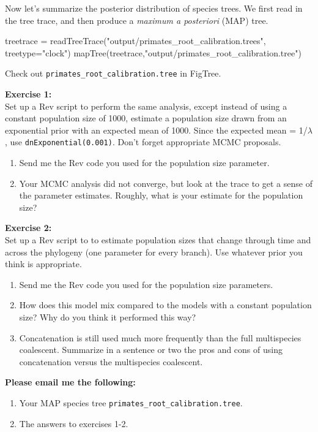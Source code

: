 \documentclass[11pt]{article}
\begin{document}
Now let's summarize the posterior distribution of species trees.
We first read in the tree trace, and then produce a \textit{maximum a posteriori} (MAP) tree.
\begin{code}
treetrace = readTreeTrace("output/primates_root_calibration.trees", treetype="clock")
mapTree(treetrace,"output/primates_root_calibration.tree")
\end{code}
Check out \texttt{primates\_root\_calibration.tree} in FigTree.

\begin{framed}
\noindent
\textbf{Exercise 1:} \\
Set up a Rev script to perform the same
analysis, except instead of using a constant
population size of 1000, estimate a population size
drawn from an exponential prior with an expected mean of 1000. 
Since the expected mean = 1/$\lambda$, use \texttt{dnExponential(0.001)}.
Don't forget appropriate MCMC proposals.
\begin{enumerate}
\item Send me the Rev code you used for the population size parameter.
\item Your MCMC analysis did not converge, but look at the trace
        to get a sense of the parameter estimates. Roughly, what is
            your estimate for the population size? %
\end{enumerate}
\end{framed}

\begin{framed}
\noindent
\textbf{Exercise 2:} \\
Set up a Rev script to to estimate
population sizes that change through time 
and across the phylogeny (one parameter for every branch).
Use whatever prior you think is appropriate.
\begin{enumerate}
\item Send me the Rev code you used for the population size parameters.
\item How does this model mix compared to the models with a constant population size? Why do you think it performed this way?
\item Concatenation is still used much more frequently than the full multispecies coalescent.
        Summarize in a sentence or two the pros and cons of using concatenation versus the multispecies coalescent.
\end{enumerate}
\end{framed}

\begin{framed}
\noindent
\textbf{Please email me the following:}
\begin{enumerate}
  \item Your MAP species tree \texttt{primates\_root\_calibration.tree}.
  \item The answers to exercises 1-2.
\end{enumerate}
\end{framed}


 
\end{document}
